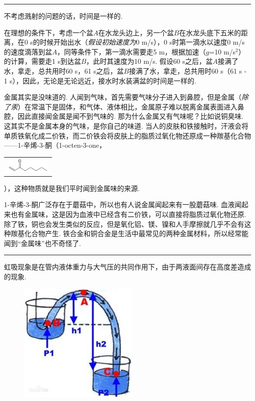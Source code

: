 \begin{multicols}{2}
    \noindent\rule{\linewidth}{1pt}
    
    \noindent{}不考虑溅射的问题的话，时间是一样的. 
    
    在理想的条件下，考虑一个盆$A$在水龙头边上，另一个盆$B$在水龙头底下五米的距离，在0 s的时候开始出水（\textit{假设初始速度为}0 m/s），0 s时第一滴水以速度0 m/s的速度滴落到盆$A$，同等条件下，第一滴水需要走5 m，根据加速（$g$=10 m/s$^2$）的计算，需要走1 s到达盆$B$，此时其速度为10 m/s. 假设60 s之后，盆$A$接满了水，拿走，总共用时60 s，61 s之后，盆$B$接满了水，拿走，总共用时60 s（61 s - 1 s），因此，无论是无论远近，接水时水装满盆的时间是一样的. 
    
    \noindent{}金属其实是没味道的. 人闻到气味，首先需要气味分子进入到鼻腔，但是金属（\textit{除了汞}）在常温下是固体，和气体、液体相比，金属原子难以脱离金属表面进入鼻腔，因此直接闻金属是闻不到气味的. 那为什么金属又有气味呢？比如说铜臭味. 这其实不是金属本身的气味，是你自己的味道. 当人的皮肤和铁接触时，汗液会将单质铁氧化成二价铁，而二价铁会将皮肤上的脂质过氧化物还原成一种羰基化合物——1-辛烯-3-酮（1-octen-3-one，\begin{tabular}{c}\includegraphics[width=6em]{IMG/201908/4.jpg}\end{tabular}
），这种物质就是我们平时闻到金属味的来源. 
    
    1-辛烯-3-酮广泛存在于蘑菇中，所以也有人说金属闻起来有一股蘑菇味. 血液闻起来也有金属味，这是因为血液中已经含有二价铁，可以直接将脂质过氧化物还原. 除了铁，铜也会发生类似的反应，但是氧化铝、镁、镍和人手摩擦就几乎不会有这种羰基化合物产生. 铁合金和铜合金是生活中最常见的两种金属材料，所以经常能闻到“金属味”也不奇怪了. 
    
    \noindent\rule{\linewidth}{1pt}
    
    \noindent{}虹吸现象是在管内液体重力与大气压的共同作用下，由于两液面间存在高度差造成的现象. 
    
     \begin{figure}[H]
        \centering
      \includegraphics[width=0.4\linewidth]{IMG/201908/5.jpg}
    \end{figure}
    

\end{multicols}

